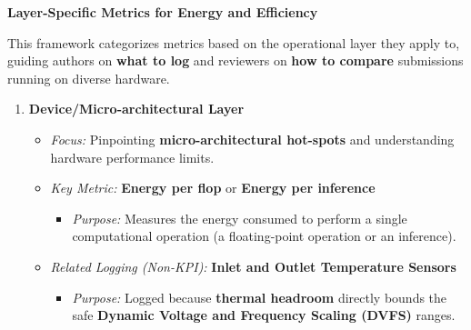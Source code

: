 

\textbf{Layer-Specific Metrics for Energy and Efficiency}

This framework categorizes metrics based on the operational layer they apply to, guiding authors on \textbf{what to log} and reviewers on \textbf{how to compare} submissions running on diverse hardware.

\vspace{0.5cm}

\begin{enumerate}
    \item \textbf{Device/Micro-architectural Layer}
    \begin{itemize}
        \item \emph{Focus:} Pinpointing \textbf{micro-architectural hot-spots} and understanding hardware performance limits.
        \item \emph{Key Metric:} \textbf{Energy per flop} or \textbf{Energy per inference}
        \begin{itemize}
            \item \emph{Purpose:} Measures the energy consumed to perform a single computational operation (a floating-point operation or an inference).
        \end{itemize}
        \item \emph{Related Logging (Non-KPI):} \textbf{Inlet and Outlet Temperature Sensors}
        \begin{itemize}
            \item \emph{Purpose:} Logged because \textbf{thermal headroom} directly bounds the safe \textbf{Dynamic Voltage and Frequency Scaling (DVFS)} ranges.
        \end{itemize}
    \end{itemize}


\end{enumerate}
